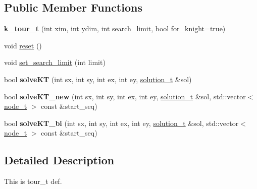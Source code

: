 \subsection*{\-Public \-Member \-Functions}
\begin{DoxyCompactItemize}
\item 
\hypertarget{classknight__path__t_1_1k__tour__t_a8a729d29a6c60a036ec3160675b8d5bc}{{\bfseries k\-\_\-tour\-\_\-t} (int xim, int ydim, int search\-\_\-limit, bool for\-\_\-knight=true)}\label{classknight__path__t_1_1k__tour__t_a8a729d29a6c60a036ec3160675b8d5bc}

\item 
void \hyperlink{classknight__path__t_1_1k__tour__t_a39d45d0794b498ac3ab312649a37234f}{reset} ()
\item 
void \hyperlink{classknight__path__t_1_1k__tour__t_ae132e8ae1ea9156a274bfeae5d1852fb}{set\-\_\-search\-\_\-limit} (int limit)
\item 
\hypertarget{classknight__path__t_1_1k__tour__t_a57f2acd9cddaf924be0691b25c0fe461}{bool {\bfseries solve\-K\-T} (int sx, int sy, int ex, int ey, \hyperlink{classknight__path__t_1_1solution__t}{solution\-\_\-t} \&sol)}\label{classknight__path__t_1_1k__tour__t_a57f2acd9cddaf924be0691b25c0fe461}

\item 
\hypertarget{classknight__path__t_1_1k__tour__t_a2dfa5592961f9b096126f3f31ee43f58}{bool {\bfseries solve\-K\-T\-\_\-new} (int sx, int sy, int ex, int ey, \hyperlink{classknight__path__t_1_1solution__t}{solution\-\_\-t} \&sol, std\-::vector$<$ \hyperlink{structknight__path__t_1_1node__t}{node\-\_\-t} $>$ const \&start\-\_\-seq)}\label{classknight__path__t_1_1k__tour__t_a2dfa5592961f9b096126f3f31ee43f58}

\item 
\hypertarget{classknight__path__t_1_1k__tour__t_a9fd952b9bb7264be8f466180c31bd8bb}{bool {\bfseries solve\-K\-T\-\_\-bi} (int sx, int sy, int ex, int ey, \hyperlink{classknight__path__t_1_1solution__t}{solution\-\_\-t} \&sol, std\-::vector$<$ \hyperlink{structknight__path__t_1_1node__t}{node\-\_\-t} $>$ const \&start\-\_\-seq)}\label{classknight__path__t_1_1k__tour__t_a9fd952b9bb7264be8f466180c31bd8bb}

\end{DoxyCompactItemize}


\subsection{\-Detailed \-Description}
\-This is tour\-\_\-t def. 

